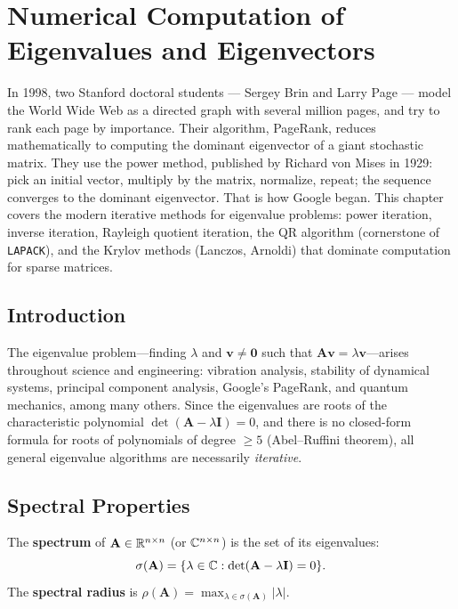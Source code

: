 
\chapter{Numerical Computation of Eigenvalues and Eigenvectors}
\label{ch:eigenvalues}


In 1998, two Stanford doctoral students --- Sergey Brin and Larry Page --- model the World Wide Web as a directed graph with several million pages, and try to rank each page by importance. Their algorithm, PageRank, reduces mathematically to computing the dominant eigenvector of a giant stochastic matrix. They use the power method, published by Richard von Mises in 1929: pick an initial vector, multiply by the matrix, normalize, repeat; the sequence converges to the dominant eigenvector. That is how Google began. This chapter covers the modern iterative methods for eigenvalue problems: power iteration, inverse iteration, Rayleigh quotient iteration, the QR algorithm (cornerstone of \texttt{LAPACK}), and the Krylov methods (Lanczos, Arnoldi) that dominate computation for sparse matrices.

\section{Introduction}

The eigenvalue problem---finding $\lambda$ and $\mathbf{v} \neq \mathbf{0}$ such that $\mathbf{A}\mathbf{v} = \lambda\mathbf{v}$---arises throughout science and engineering: vibration analysis, stability of dynamical systems, principal component analysis, Google's PageRank, and quantum mechanics, among many others. Since the eigenvalues are roots of the characteristic polynomial $\det(\mathbf{A} - \lambda\mathbf{I}) = 0$, and there is no closed-form formula for roots of polynomials of degree $\geq 5$ (Abel--Ruffini theorem), all general eigenvalue algorithms are necessarily \emph{iterative}.

\section{Spectral Properties}

\begin{definition}[Spectrum]
\label{def:spectrum}
The \textbf{spectrum} of $\mathbf{A} \in \mathbb{R}^{n \times n}$ (or $\mathbb{C}^{n \times n}$) is the set of its eigenvalues:
\[
    \sigma(\mathbf{A}) = \{\lambda \in \mathbb{C} : \det(\mathbf{A} - \lambda\mathbf{I}) = 0\}.
\]
The \textbf{spectral radius} is $\rho(\mathbf{A}) = \max_{\lambda \in \sigma(\mathbf{A})} |\lambda|$.
\end{definition}

